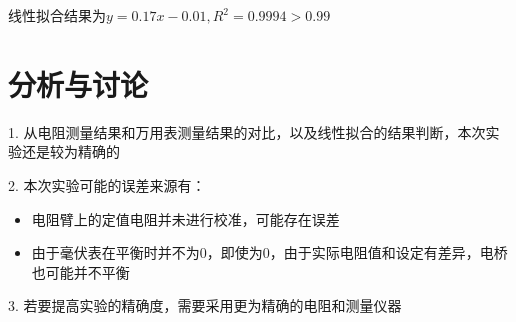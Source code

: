 \documentclass{article}
\begin{document}
线性拟合结果为$y = 0.17x - 0.01, R^2 = 0.9994 > 0.99 $

\newpage

\section{分析与讨论}
1. 从电阻测量结果和万用表测量结果的对比，以及线性拟合的结果判断，本次实验还是较为精确的

2. 本次实验可能的误差来源有：
\begin{itemize}
    \item 电阻臂上的定值电阻并未进行校准，可能存在误差
    \item 由于毫伏表在平衡时并不为0，即使为0，由于实际电阻值和设定有差异，电桥也可能并不平衡
\end{itemize}

3. 若要提高实验的精确度，需要采用更为精确的电阻和测量仪器
\end{document}
